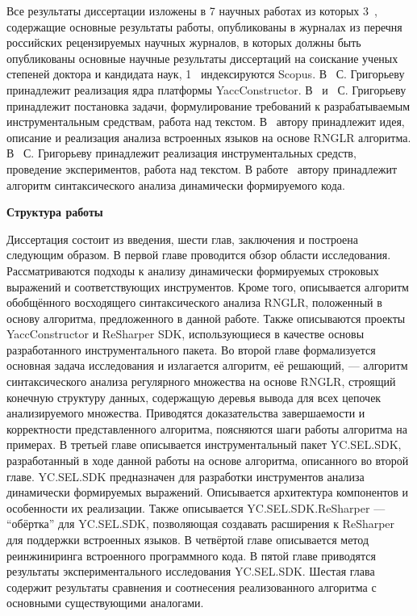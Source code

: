 Все результаты диссертации изложены в 7 научных работах из которых 3~\cite{YCArticle,SELforIDEru,AbstractGLL}, содержащие основные результаты работы, опубликованы в журналах из перечня российских рецензируемых научных журналов, в которых должны быть опубликованы основные научные результаты диссертаций на соискание ученых степеней доктора и кандидата наук, 
1~\cite{GLRAbsPars} индексируются Scopus. В~\cite{Syrcose} С. Григорьеву принадлежит реализация ядра платформы YaccConstructor. В~\cite{SELforIDEru, AbstractGLL} и~\cite{SELforIDE} С. Григорьеву принадлежит постановка задачи, формулирование требований к разрабатываемым инструментальным средствам, работа над текстом. 
В~\cite{GLRAbsPars} автору принадлежит идея, описание и реализация анализа встроенных языков на основе RNGLR алгоритма.  В~\cite{YCArticle} С. Григорьеву принадлежит реализация инструментальных средств, проведение экспериментов, работа над текстом. В работе~\cite{RelaxedARNGLR} автору принадлежит алгоритм синтаксического анализа динамически формируемого кода.


\textbf{Структура работы}

Диссертация состоит из введения, шести глав, заключения и построена следующим образом. В первой главе проводится обзор области исследования. Рассматриваются подходы к анализу динамически формируемых строковых выражений и соответствующих инструментов. Кроме того, описывается алгоритм обобщённого восходящего синтаксического анализа RNGLR, положенный в основу алгоритма, предложенного в данной работе. Также описываются 
проекты YaccConstructor и ReSharper SDK, использующиеся в качестве основы разработанного инструментального пакета. Во второй главе формализуется основная задача исследования и излагается алгоритм, её решающий, --- алгоритм синтаксического анализа регулярного множества на основе RNGLR, строящий конечную структуру данных, содержащую деревья вывода для всех цепочек анализируемого множества. Приводятся доказательства завершаемости и корректности представленного алгоритма, поясняются шаги работы алгоритма на примерах. В третьей главе описывается инструментальный пакет YC.SEL.SDK, разработанный в ходе данной работы на основе алгоритма, описанного во второй главе. YC.SEL.SDK предназначен для разработки инструментов анализа динамически формируемых выражений. Описывается архитектура компонентов и особенности их реализации. Также описывается YC.SEL.SDK.ReSharper --- ``обёртка'' для YC.SEL.SDK, позволяющая создавать расширения к ReSharper для поддержки встроенных языков. В четвёртой главе описывается метод реинжиниринга встроенного программного кода.  В пятой главе приводятся результаты экспериментального исследования YC.SEL.SDK. Шестая глава содержит результаты сравнения и соотнесения реализованного алгоритма с основными существующими аналогами.


\clearpage
